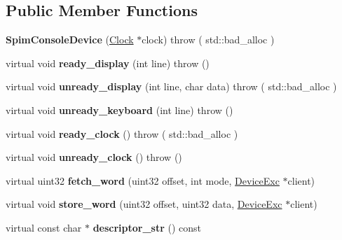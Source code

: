 \subsection*{Public Member Functions}
\begin{DoxyCompactItemize}
\item 
\hypertarget{classSpimConsoleDevice_a5f551a1fb38ddc2fa858e3ba6a7f4d8d}{
{\bfseries SpimConsoleDevice} (\hyperlink{classClock}{Clock} $\ast$clock)  throw ( std::bad\_\-alloc )}
\label{classSpimConsoleDevice_a5f551a1fb38ddc2fa858e3ba6a7f4d8d}

\item 
\hypertarget{classSpimConsoleDevice_a08bf5b3c9651f945ef46fac6f5ab0a8a}{
virtual void {\bfseries ready\_\-display} (int line)  throw ()}
\label{classSpimConsoleDevice_a08bf5b3c9651f945ef46fac6f5ab0a8a}

\item 
\hypertarget{classSpimConsoleDevice_a05eaad591781ef58baad9905c2f3dbde}{
virtual void {\bfseries unready\_\-display} (int line, char data)  throw ( std::bad\_\-alloc )}
\label{classSpimConsoleDevice_a05eaad591781ef58baad9905c2f3dbde}

\item 
\hypertarget{classSpimConsoleDevice_a69b27e3320892b3190c94bc0124c3705}{
virtual void {\bfseries unready\_\-keyboard} (int line)  throw ()}
\label{classSpimConsoleDevice_a69b27e3320892b3190c94bc0124c3705}

\item 
\hypertarget{classSpimConsoleDevice_a4a6473276fdd22bb253b0275d3aaf622}{
virtual void {\bfseries ready\_\-clock} ()  throw ( std::bad\_\-alloc )}
\label{classSpimConsoleDevice_a4a6473276fdd22bb253b0275d3aaf622}

\item 
\hypertarget{classSpimConsoleDevice_a3feff73864a3fc39e88924c2ae29b358}{
virtual void {\bfseries unready\_\-clock} ()  throw ()}
\label{classSpimConsoleDevice_a3feff73864a3fc39e88924c2ae29b358}

\item 
\hypertarget{classSpimConsoleDevice_a10a8f062fcee183b49c1cfaab2d729cb}{
virtual uint32 {\bfseries fetch\_\-word} (uint32 offset, int mode, \hyperlink{classDeviceExc}{DeviceExc} $\ast$client)}
\label{classSpimConsoleDevice_a10a8f062fcee183b49c1cfaab2d729cb}

\item 
\hypertarget{classSpimConsoleDevice_a171e1c405553688ac6d7a344579c4762}{
virtual void {\bfseries store\_\-word} (uint32 offset, uint32 data, \hyperlink{classDeviceExc}{DeviceExc} $\ast$client)}
\label{classSpimConsoleDevice_a171e1c405553688ac6d7a344579c4762}

\item 
\hypertarget{classSpimConsoleDevice_ade305bc5e335fc57fde48661b2fac932}{
virtual const char $\ast$ {\bfseries descriptor\_\-str} () const }
\label{classSpimConsoleDevice_ade305bc5e335fc57fde48661b2fac932}

\end{DoxyCompactItemize}
